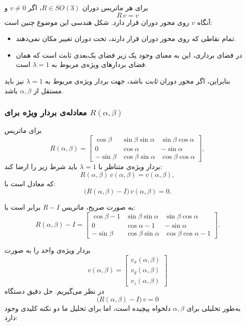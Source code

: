 \documentclass{article}
\begin{document}
برای هر ماتریس دوران \(R\in SO(3)\)، اگر \(v\neq 0\) و
\[
R\,v = v
\]
آنگاه \(v\) روی محور دوران قرار دارد. شکل هندسی این موضوع چنین است:
\begin{itemize}
	\item تمام نقاطی که روی محور دوران قرار دارند، تحت دوران تغییر مکان نمی‌دهند.
	\item در فضای برداری، این به معنای وجود یک زیر فضای یک‌بعدی ثابت است که همان فضای بردارهای ویژه‌ی مربوط به \(\lambda=1\) است.
\end{itemize}

بنابراین، اگر محور دوران \emph{ثابت} باشد، جهت بردار ویژه‌ی مربوط به \(\lambda=1\) نیز باید مستقل از \(\alpha,\beta\) باشد.

\subsubsection{معادله‌ی بردار ویژه برای \texorpdfstring{$R(\alpha,\beta)$}{R(alpha,beta)}}

برای ماتریس
\[
R(\alpha,\beta) =
\begin{bmatrix}
	\cos\beta & \sin\beta\sin\alpha & \sin\beta\cos\alpha\\
	0 & \cos\alpha & -\sin\alpha\\
	-\sin\beta & \cos\beta\sin\alpha & \cos\beta\cos\alpha
\end{bmatrix},
\]
بردار ویژه‌ی متناظر با \(\lambda=1\) باید شرط زیر را ارضا کند:
\[
R(\alpha,\beta)\,v(\alpha,\beta) = v(\alpha,\beta),
\]
که معادل است با:
\[
\bigl(R(\alpha,\beta) - I\bigr)\,v(\alpha,\beta) = 0.
\]

به صورت صریح، ماتریس \(R - I\) برابر است با:
\[
R(\alpha,\beta)-I =
\begin{bmatrix}
	\cos\beta - 1 & \sin\beta\sin\alpha & \sin\beta\cos\alpha\\[4pt]
	0 & \cos\alpha - 1 & -\sin\alpha\\[4pt]
	-\sin\beta & \cos\beta\sin\alpha & \cos\beta\cos\alpha - 1
\end{bmatrix}.
\]

بردار ویژه‌ی واحد را به صورت
\[
v(\alpha,\beta) =
\begin{bmatrix}
	v_x(\alpha,\beta)\\
	v_y(\alpha,\beta)\\
	v_z(\alpha,\beta)
\end{bmatrix}
\]
در نظر می‌گیریم. حل دقیق دستگاه
\[
\bigl(R(\alpha,\beta)-I\bigr)\,v=0
\]
به‌طور تحلیلی برای \(\alpha,\beta\) دلخواه پیچیده است، اما برای تحلیل ما دو نکته کلیدی وجود دارد:
\end{document}
